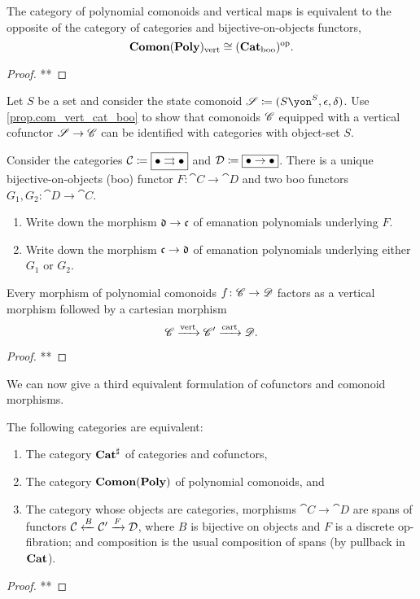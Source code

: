 \documentclass[DynamicalBook]{subfiles}
\begin{document}
\begin{proposition}\label{prop.com_vert_cat_boo}
The category of polynomial comonoids and vertical maps is equivalent to the opposite of the category of categories and bijective-on-objects functors,
\[
\textbf{Comon}(\textbf{Poly})_{\text{vert}}\cong(\textbf{Cat}_{\text{boo}})^{\textnormal{op}}.
\]
\end{proposition}
\begin{proof}
**
\end{proof}

\begin{exercise}
Let $S$ be a set and consider the state comonoid $\com{S}\coloneqq(S\yon^S,\epsilon,\delta)$. Use \cref{prop.com_vert_cat_boo} to show that comonoids $\mathscr{C}$ equipped with a vertical cofunctor $\mathscr{S}\to\mathscr{C}$ can be identified with categories with object-set $S$.
\end{exercise}

\begin{exercise}
Consider the categories $\mathcal{C}\coloneqq\fbox{$\bullet\rightrightarrows\bullet$}$ and $\mathcal{D}\coloneqq\fbox{$\bullet\to\bullet$}$. There is a unique bijective-on-objects (boo) functor $F\colon\cat{C}\to\cat{D}$ and two boo functors $G_1,G_2\colon\cat{D}\to\cat{C}$.
\begin{enumerate}
	\item Write down the morphism $\mathfrak{d}\to\mathfrak{c}$ of emanation polynomials underlying $F$.
	\item Write down the morphism $\mathfrak{c}\to\mathfrak{d}$ of emanation polynomials underlying either $G_1$ or $G_2$.
\qedhere
\end{enumerate}
\end{exercise}

\begin{proposition}
Every morphism of polynomial comonoids $f\colon\mathscr{C}\to\mathscr{D}$ factors as a vertical morphism followed by a cartesian morphism
\[
\mathscr{C}\xrightarrow{\text{vert}}\mathscr{C}'\xrightarrow{\text{cart}}\mathscr{D}.
\]
\end{proposition}
\begin{proof}
**
\end{proof}

We can now give a third equivalent formulation of cofunctors and comonoid morphisms.

\begin{proposition}
The following categories are equivalent:
\begin{enumerate}
	\item The category $\textbf{Cat}^\sharp$ of categories and cofunctors,
	\item The category $\textbf{Comon}(\textbf{Poly})$ of polynomial comonoids, and
	\item The category whose objects are categories, morphisms $\cat{C}\to\cat{D}$ are spans of functors $\mathcal{C}\xleftarrow{B}\mathcal{C}'\xrightarrow{F}\mathcal{D}$, where $B$ is bijective on objects and $F$ is a discrete op-fibration; and composition is the usual composition of spans (by pullback in $\textbf{Cat}$).
\end{enumerate}
\end{proposition}
\begin{proof}
**
\end{proof}
\end{document}

